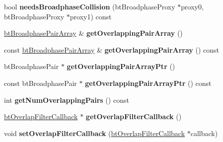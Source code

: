 \begin{DoxyCompactItemize}
\item 
\mbox{\label{classbtSortedOverlappingPairCache_a77493e0dd75457eb30638bc636028b44}} 
bool {\bfseries needs\+Broadphase\+Collision} (bt\+Broadphase\+Proxy $\ast$proxy0, bt\+Broadphase\+Proxy $\ast$proxy1) const
\item 
\mbox{\label{classbtSortedOverlappingPairCache_ae71e7fdb0e6bc39334d960a645cc1042}} 
\hyperlink{classbtAlignedObjectArray}{bt\+Broadphase\+Pair\+Array} \& {\bfseries get\+Overlapping\+Pair\+Array} ()
\item 
\mbox{\label{classbtSortedOverlappingPairCache_afaf36ce10a54a530489c673bfd480fa7}} 
const \hyperlink{classbtAlignedObjectArray}{bt\+Broadphase\+Pair\+Array} \& {\bfseries get\+Overlapping\+Pair\+Array} () const
\item 
\mbox{\label{classbtSortedOverlappingPairCache_a11d3a6e1e0ffacc51fb8d803d3b12f83}} 
bt\+Broadphase\+Pair $\ast$ {\bfseries get\+Overlapping\+Pair\+Array\+Ptr} ()
\item 
\mbox{\label{classbtSortedOverlappingPairCache_a9d41b216956d21c0ea31e426aa34714d}} 
const bt\+Broadphase\+Pair $\ast$ {\bfseries get\+Overlapping\+Pair\+Array\+Ptr} () const
\item 
\mbox{\label{classbtSortedOverlappingPairCache_a796553ee8202c158adc57e3dfecff0a8}} 
int {\bfseries get\+Num\+Overlapping\+Pairs} () const
\item 
\mbox{\label{classbtSortedOverlappingPairCache_ac31e0bde69f0464519ae7753274681c6}} 
\hyperlink{structbtOverlapFilterCallback}{bt\+Overlap\+Filter\+Callback} $\ast$ {\bfseries get\+Overlap\+Filter\+Callback} ()
\item 
\mbox{\label{classbtSortedOverlappingPairCache_a80a1d641ded9fb21e9b4144e43bca664}} 
void {\bfseries set\+Overlap\+Filter\+Callback} (\hyperlink{structbtOverlapFilterCallback}{bt\+Overlap\+Filter\+Callback} $\ast$callback)
\item 
\mbox{\label{classbtSortedOverlappingPairCache_a6b0a1c63e64e7975275b0c535261bc47}} 

\end{DoxyCompactItemize}
